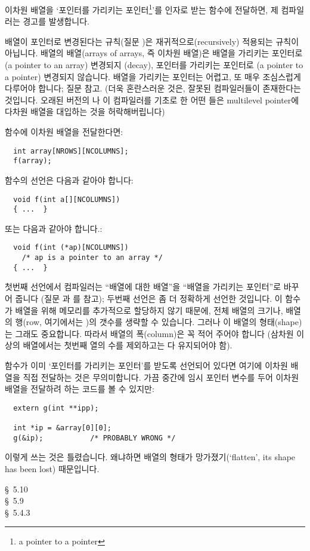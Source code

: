 \begin{faq}
	이차원 배열을 `포인터를 가리키는
	포인터\footnote{a pointer to a pointer}'를 인자로 받는 함수에
	전달하면, 제 컴파일러는 경고를 발생합니다.

\A
	배열이 포인터로 변경된다는 규칙(질문 )은
	재귀적으로(recursively) 적용되는 규칙이 아닙니다.
	배열의 배열(arrays of arrays, 즉 이차원 배열)은 배열을 가리키는
	포인터로 (a pointer to an array) 변경되지 (decay),
	포인터를 가리키는 포인터로 (a pointer to a pointer) 변경되지
	않습니다. 배열을 가리키는 포인터는 어렵고, 또 매우 조심스럽게 다루어야
	합니다; 질문  참고. (더욱 혼란스러운 것은, 잘못된 컴파일러들이
	존재한다는 것입니다. 오래된 버전의 나 이 컴파일러를 기초로 한
	어떤 들은 multilevel pointer에 다차원 배열을 대입하는 것을
	허락해버립니다)

	함수에 이차원 배열을 전달한다면:
\begin{verbatim}
  int array[NROWS][NCOLUMNS];
  f(array);
\end{verbatim}
	\noindent 함수의 선언은 다음과 같아야 합니다:
\begin{verbatim}
  void f(int a[][NCOLUMNS])
  { ...  }
\end{verbatim}
	\noindent 또는 다음과 같아야 합니다.:
\begin{verbatim}
  void f(int (*ap)[NCOLUMNS]) 
    /* ap is a pointer to an array */
  { ...  }
\end{verbatim}
	첫번째 선언에서 컴파일러는 ``배열에 대한 배열''을 ``배열을 가리키는
	포인터''로 바꾸어 줍니다 (질문 과 를 참고); 
        두번째 선언은
	좀 더 정확하게 선언한 것입니다. 이 함수가 배열을 위해 메모리를
	추가적으로 할당하지 않기 때문에, 전체 배열의 크기나,
	배열의 행(row, 여기에서는 )의 갯수를 생략할 수 있습니다.
	그러나 이 배열의 형태(shape)는 그래도 중요합니다. 따라서 배열의
	폭(column)은 꼭 적어 주어야 합니다 (삼차원 이상의 배열에서는
	첫번째 열의 수를 제외하고는 다 유지되어야 함).

	함수가 이미 `포인터를 가리키는 포인터'를 받도록 선언되어 있다면
	여기에 이차원 배열을 직접 전달하는 것은 무의미합니다. 가끔 중간에
	임시 포인터 변수를 두어 이차원 배열을 전달하려 하는 코드를 볼 수
	있지만:
\begin{verbatim}
  extern g(int **ipp);

  int *ip = &array[0][0];
  g(&ip);           /* PROBABLY WRONG */
\end{verbatim}
	\noindent 이렇게 쓰는 것은 틀렸습니다. 왜냐하면 배열의 형태가
	망가졌기(`flatten', its shape has been lost) 때문입니다.

\R
	\cite{kr1} \S\ 5.10  \\
	\cite{kr2} \S\ 5.9  \\
	\cite{hs} \S\ 5.4.3 
\end{faq}

